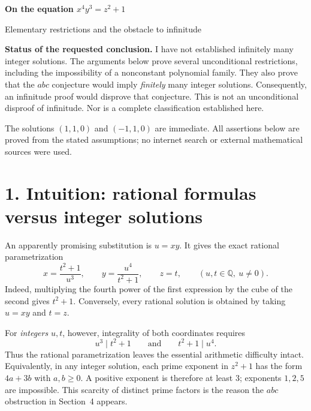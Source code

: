 \documentclass[11pt,a4paper]{article}
\begin{document}
\thispagestyle{empty}
{\Large\bfseries\color{ink} On the equation $x^4y^3=z^2+1$}\par
{\large Elementary restrictions and the obstacle to infinitude}\par
\vspace{3mm}

\textbf{Status of the requested conclusion.}
I have not established infinitely many integer solutions. The arguments below
prove several unconditional restrictions, including the impossibility of a
nonconstant polynomial family. They also prove that the $abc$ conjecture would
imply \emph{finitely} many integer solutions. Consequently, an infinitude proof
would disprove that conjecture. This is not an unconditional disproof of
infinitude. Nor is a complete classification established here.

The solutions $(1,1,0)$ and $(-1,1,0)$ are immediate. All assertions below are
proved from the stated assumptions; no internet search or external mathematical
sources were used.

\section*{1. Intuition: rational formulas versus integer solutions}
An apparently promising substitution is $u=xy$. It gives the exact rational
parametrization
\[
 x=\frac{t^2+1}{u^3},\qquad
 y=\frac{u^4}{t^2+1},\qquad z=t,
 \qquad (u,t\in\mathbb Q,\ u\ne0).
\]
Indeed, multiplying the fourth power of the first expression by the cube of
the second gives $t^2+1$. Conversely, every rational solution is obtained by
taking $u=xy$ and $t=z$.

For \emph{integers} $u,t$, however, integrality of both coordinates requires
\[
 u^3\mid t^2+1\qquad\text{and}\qquad t^2+1\mid u^4.
\]
Thus the rational parametrization leaves the essential arithmetic difficulty
intact. Equivalently, in any integer solution, each prime exponent in $z^2+1$
has the form $4a+3b$ with $a,b\ge0$. A positive exponent is therefore at least
$3$; exponents $1,2,5$ are impossible. This scarcity of distinct prime factors
is the reason the $abc$ obstruction in Section~4 appears.
\end{document}
